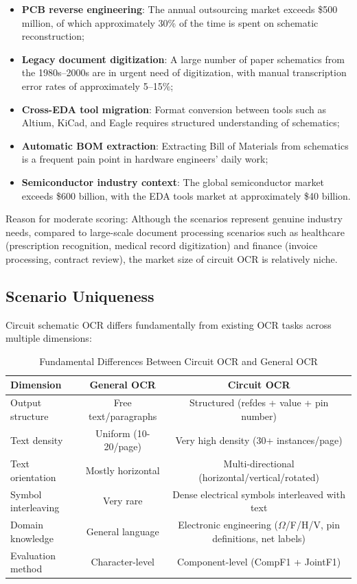 \begin{itemize}[nosep]
    \item \textbf{PCB reverse engineering}: The annual outsourcing market exceeds \$500 million, of which approximately 30\% of the time is spent on schematic reconstruction;
    \item \textbf{Legacy document digitization}: A large number of paper schematics from the 1980s--2000s are in urgent need of digitization, with manual transcription error rates of approximately 5--15\%;
    \item \textbf{Cross-EDA tool migration}: Format conversion between tools such as Altium, KiCad, and Eagle requires structured understanding of schematics;
    \item \textbf{Automatic BOM extraction}: Extracting Bill of Materials from schematics is a frequent pain point in hardware engineers' daily work;
    \item \textbf{Semiconductor industry context}: The global semiconductor market exceeds \$600 billion, with the EDA tools market at approximately \$40 billion.
\end{itemize}

Reason for moderate scoring: Although the scenarios represent genuine industry needs, compared to large-scale document processing scenarios such as healthcare (prescription recognition, medical record digitization) and finance (invoice processing, contract review), the market size of circuit OCR is relatively niche.

\subsection{Scenario Uniqueness}

Circuit schematic OCR differs fundamentally from existing OCR tasks across multiple dimensions:

\begin{table}[h]
\centering
\caption{Fundamental Differences Between Circuit OCR and General OCR}
\begin{tabular}{lcc}
\toprule
\textbf{Dimension} & \textbf{General OCR} & \textbf{Circuit OCR} \\
\midrule
Output structure   & Free text/paragraphs   & Structured (refdes + value + pin number) \\
Text density       & Uniform (10-20/page)  & Very high density (30+ instances/page) \\
Text orientation   & Mostly horizontal      & Multi-directional (horizontal/vertical/rotated) \\
Symbol interleaving & Very rare              & Dense electrical symbols interleaved with text \\
Domain knowledge   & General language       & Electronic engineering ($\Omega$/F/H/V, pin definitions, net labels) \\
Evaluation method  & Character-level        & Component-level (CompF1 + JointF1) \\
\bottomrule
\end{tabular}
\end{table}

